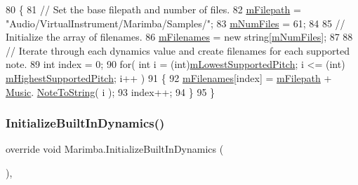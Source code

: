 \begin{DoxyCode}
80     \{
81         \textcolor{comment}{// Set the base filepath and number of files.}
82         \hyperlink{group___v_i_base_pro_var_gac428224be859933d720a9c533fdb5643}{mFilepath} = \textcolor{stringliteral}{"Audio/VirtualInstrument/Marimba/Samples/"};
83         \hyperlink{group___v_i_base_pro_var_ga9a602db8c9833ce75d95dd453c27d341}{mNumFiles} = 61;
84 
85         \textcolor{comment}{// Initialize the array of filenames.}
86         \hyperlink{group___v_i_base_pro_var_gab2add474ca506357688b5dd08cac4cb5}{mFilenames} = \textcolor{keyword}{new} \textcolor{keywordtype}{string}[\hyperlink{group___v_i_base_pro_var_ga9a602db8c9833ce75d95dd453c27d341}{mNumFiles}];
87 
88         \textcolor{comment}{// Iterate through each dynamics value and create filenames for each supported note.}
89         \textcolor{keywordtype}{int} index = 0;
90         \textcolor{keywordflow}{for}( \textcolor{keywordtype}{int} i = (\textcolor{keywordtype}{int})\hyperlink{group___v_i_base_pro_var_ga3cae52b1bcc0178a8a6b03c7aaf7aac8}{mLowestSupportedPitch}; i <= (int)
      \hyperlink{group___v_i_base_pro_var_ga61fb2c33b53a0f663047779d7ceb18f3}{mHighestSupportedPitch}; i++ )
91         \{
92             \hyperlink{group___v_i_base_pro_var_gab2add474ca506357688b5dd08cac4cb5}{mFilenames}[index] = \hyperlink{group___v_i_base_pro_var_gac428224be859933d720a9c533fdb5643}{mFilepath} + \hyperlink{class_music}{Music}.
      \hyperlink{group___music_stat_func_ga85a22c905d56d4c5f4e62159bfecee8c}{NoteToString}( i );
93             index++;
94         \}
95     \}
\end{DoxyCode}
\mbox{\label{group___mar_virt_func_ga293d829cb8571c21452c23e90968b2d8}} 
\subsubsection{\texorpdfstring{Initialize\+Built\+In\+Dynamics()}{InitializeBuiltInDynamics()}}
{\footnotesize\ttfamily override void Marimba.\+Initialize\+Built\+In\+Dynamics (\begin{DoxyParamCaption}{ }\end{DoxyParamCaption})\hspace{0.3cm}{\ttfamily [protected]}, {\ttfamily [virtual]}}



